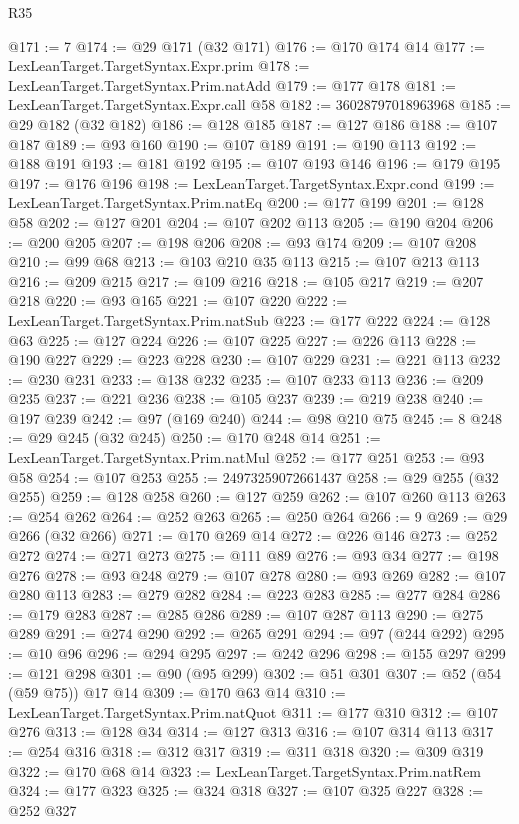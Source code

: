 \begin{lexlean}{R35}
\begin{coremodule}
@171 := 7
@174 := @29 @171 (@32 @171)
@176 := @170 @174 @14
@177 := LexLeanTarget.TargetSyntax.Expr.prim
@178 := LexLeanTarget.TargetSyntax.Prim.natAdd
@179 := @177 @178
@181 := LexLeanTarget.TargetSyntax.Expr.call @58
@182 := 36028797018963968
@185 := @29 @182 (@32 @182)
@186 := @128 @185
@187 := @127 @186
@188 := @107 @187
@189 := @93 @160
@190 := @107 @189
@191 := @190 @113
@192 := @188 @191
@193 := @181 @192
@195 := @107 @193 @146
@196 := @179 @195
@197 := @176 @196
@198 := LexLeanTarget.TargetSyntax.Expr.cond
@199 := LexLeanTarget.TargetSyntax.Prim.natEq
@200 := @177 @199
@201 := @128 @58
@202 := @127 @201
@204 := @107 @202 @113
@205 := @190 @204
@206 := @200 @205
@207 := @198 @206
@208 := @93 @174
@209 := @107 @208
@210 := @99 @68
@213 := @103 @210 @35 @113
@215 := @107 @213 @113
@216 := @209 @215
@217 := @109 @216
@218 := @105 @217
@219 := @207 @218
@220 := @93 @165
@221 := @107 @220
@222 := LexLeanTarget.TargetSyntax.Prim.natSub
@223 := @177 @222
@224 := @128 @63
@225 := @127 @224
@226 := @107 @225
@227 := @226 @113
@228 := @190 @227
@229 := @223 @228
@230 := @107 @229
@231 := @221 @113
@232 := @230 @231
@233 := @138 @232
@235 := @107 @233 @113
@236 := @209 @235
@237 := @221 @236
@238 := @105 @237
@239 := @219 @238
@240 := @197 @239
@242 := @97 (@169 @240)
@244 := @98 @210 @75
@245 := 8
@248 := @29 @245 (@32 @245)
@250 := @170 @248 @14
@251 := LexLeanTarget.TargetSyntax.Prim.natMul
@252 := @177 @251
@253 := @93 @58
@254 := @107 @253
@255 := 24973259072661437
@258 := @29 @255 (@32 @255)
@259 := @128 @258
@260 := @127 @259
@262 := @107 @260 @113
@263 := @254 @262
@264 := @252 @263
@265 := @250 @264
@266 := 9
@269 := @29 @266 (@32 @266)
@271 := @170 @269 @14
@272 := @226 @146
@273 := @252 @272
@274 := @271 @273
@275 := @111 @89
@276 := @93 @34
@277 := @198 @276
@278 := @93 @248
@279 := @107 @278
@280 := @93 @269
@282 := @107 @280 @113
@283 := @279 @282
@284 := @223 @283
@285 := @277 @284
@286 := @179 @283
@287 := @285 @286
@289 := @107 @287 @113
@290 := @275 @289
@291 := @274 @290
@292 := @265 @291
@294 := @97 (@244 @292)
@295 := @10 @96
@296 := @294 @295
@297 := @242 @296
@298 := @155 @297
@299 := @121 @298
@301 := @90 (@95 @299)
@302 := @51 @301
@307 := @52 (@54 (@59 @75)) @17 @14
@309 := @170 @63 @14
@310 := LexLeanTarget.TargetSyntax.Prim.natQuot
@311 := @177 @310
@312 := @107 @276
@313 := @128 @34
@314 := @127 @313
@316 := @107 @314 @113
@317 := @254 @316
@318 := @312 @317
@319 := @311 @318
@320 := @309 @319
@322 := @170 @68 @14
@323 := LexLeanTarget.TargetSyntax.Prim.natRem
@324 := @177 @323
@325 := @324 @318
@327 := @107 @325 @227
@328 := @252 @327

\end{coremodule}
\end{lexlean}
